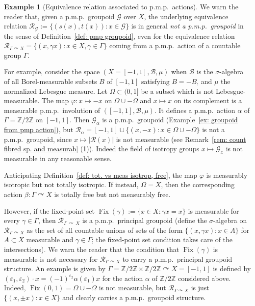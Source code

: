 \documentclass[10pt]{amsart}
\theoremstyle{definition}
\newtheorem{exam}[cdrthm]{Example}
\newcommand{\Zmath}{\mathbb{Z}}
\newcommand{\acting}{\curvearrowright}
\newcommand{\RR}{\mathcal{R}}
\newcommand{\cg}{\mathcal{G}}
\newcommand{\rb}{\mathscr{B}}
\DeclareMathOperator{\Fix}{Fix}
\newcommand{\ph}{\varphi}
\newcommand{\pmp}{p.m.p.\ }
\begin{document}
\begin{exam}[Equivalence relation associated to \pmp actions]\label{ex: example equiv-rel pmp act non meas.}
We warn the reader that, given a \pmp groupoid $\cg$ over $X$, the underlying equivalence relation $\RR_\cg := \{(s(x),t(x)): x \in \cg\}$ is in general \emph{not a \pmp groupoid} in the sense of Definition~\ref{def: pmp groupoid}, even for the equivalence relation $\RR_{\Gamma \acting X} = \{(x,\gamma x): x\in X,\gamma \in \Gamma \}$ coming from a \pmp action of a countable group $\Gamma$.

For example, consider the space $(X=[-1,1],\rb,\mu)$ when $\rb$ is the $\sigma$-algebra of all Borel-measurable subsets $B$ of $[-1,1]$ satisfying $B=-B$, and $\mu$ the normalized Lebesgue measure. Let $\Omega \subset(0,1]$ be a subset which is not Lebesgue-measurable. The map $\ph:x \mapsto -x$ on $\Omega \cup -\Omega$ and $x \mapsto x$ on its complement is a measurable \pmp involution of $([-1,1],\rb,\mu)$. It defines a \pmp action $\alpha$ of $\Gamma= \Zmath/2\Zmath$ on $[-1,1]$. Then $\cg_{\alpha}$ is a \pmp groupoid (Example~\ref{ex: groupoid from pmp action}), but $\RR_{\alpha} = [-1,1] \cup \{(x,-x): x\in \Omega \cup -\Omega\}$ is not a \pmp groupoid, since $x\mapsto \vert \RR(x)\vert$ is not measurable (see Remark~\ref{rem: count fibred sp. and measurab} (1)). Indeed the field of isotropy groups $x\mapsto \cg_x$ is not measurable in any reasonable sense.

Anticipating Definition~\ref{def: tot. vs meas isotrop, free}, the map $\ph$ is measurably isotropic but not totally isotropic. If instead, $\Omega=X$, then the corresponding action $\beta:\Gamma \acting X$ is totally free but not measurably free.

However, if the fixed-point set $\Fix (\gamma) := \{x \in X:\gamma x=x\}$ is measurable for every $\gamma \in \Gamma$, then $\RR_{\Gamma\,\acting\,X}$ is a \pmp principal groupoid (define the $\sigma$-algebra on $\RR_{\Gamma \acting X}$ as the set of all countable unions of sets of the form $\{(x,\gamma x): x \in A\}$ for $A \subset X$ measurable and $\gamma \in \Gamma$; the fixed-point set condition takes care of the intersections). We warn the reader that the condition that $\Fix(\gamma)$ is measurable is not necessary for $\RR_{\Gamma \acting X}$ to carry a \pmp principal groupoid structure. An example is given by $\Gamma =\Zmath/2\Zmath \times \Zmath/2\Zmath \acting X=[-1,1]$ is defined by $(\varepsilon_1,\varepsilon_2) \cdot x=(-1)^{\varepsilon_2} \alpha(\varepsilon_1) x$ for the action $\alpha$ of $\Zmath/2\Zmath$ considered above. Indeed, $\Fix(0,1)=\Omega \cup -\Omega$ is not measurable, but $\RR_{\Gamma \acting X}$ is just $\{(x,\pm x):x \in X\}$ and clearly carries a \pmp groupoid structure.


\end{exam}
\end{document}
